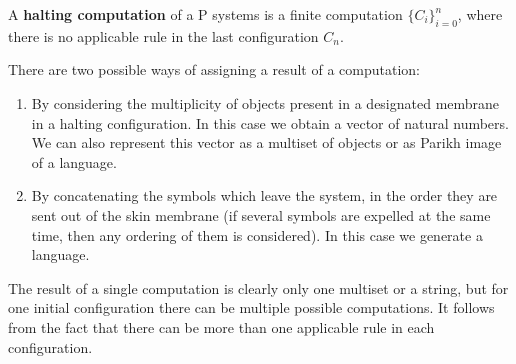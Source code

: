 A {\bf halting computation} of a P systems is a finite computation $\{C_i\}_{i=0}^n$, where there is no applicable rule in the last configuration $C_n$.


There are two possible ways of assigning a result of a computation:

\begin{enumerate}
    \item By considering the multiplicity of objects present in a designated membrane in a halting configuration. In this case we obtain a vector of natural numbers. We can also represent this vector as a multiset of objects or as Parikh image of a language.
    \item By concatenating the symbols which leave the system, in the order they are sent out of the skin membrane (if several symbols are expelled at the same time, then any ordering of them is considered). In this case we generate a language.
\end{enumerate}

The result of a single computation is clearly only one multiset or a string, but for one initial configuration there can be multiple possible computations. It follows from the fact that there can be more than one applicable rule in each configuration.
